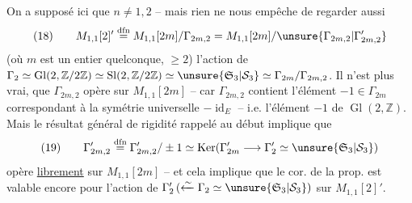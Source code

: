 On a supposé ici que $n\ne1,2$ -- mais rien ne nous empêche de regarder aussi 
\[
(18)\qquad M_{1,1}[2]'\overset{\mathrm{dfn}}{=}M_{1,1}[2m]/\Gamma_{2m,2}
=M_{1,1}[2m]/\unsure{\Gamma_{2m,2}|\Gamma'_{2m,2}}
\]
(où $m$ est un entier quelconque, $\ge2$)
l'action de $\Gamma_2\simeq\operatorname{Gl}(2,\mathbb Z/2\mathbb Z)\simeq\operatorname{Sl}(2,\mathbb Z/2\mathbb Z)\simeq\unsure{\mathfrak S_3|\mathcal S_3}\simeq\Gamma_{2m}/\Gamma_{2m,2}$.  Il n'est plus vrai,  que $\Gamma_{2m,2}$ opère  sur $M_{1,1}[2m]$ -- car $\Gamma_{2m,2}$ contient l'élément $-1\in\Gamma_{2m}$ correspondant à la symétrie universelle $-\operatorname{id}_E$ -- i.e.  l'élément  $-1$ de $\operatorname{Gl}(2,\mathbb Z)$. Mais le résultat général de rigidité rappelé au début implique que 
\[
(19)\qquad\Gamma'_{2m,2}\overset{\mathrm{dfn}}{=}\Gamma_{2m,2}'/\pm1
\simeq\operatorname{Ker}(\Gamma'_{2m}\longrightarrow\Gamma'_2\simeq\unsure{\mathfrak S_3|\mathcal S_3})
\]
opère   \uline{librement} sur $M_{1,1}[2m]$ -- et cela implique que le cor. de la prop. est valable encore pour l'action de $\Gamma'_2\,(\xleftarrow{\sim}\Gamma_2\simeq\unsure{\mathfrak S_3|\mathcal S_3})$ sur $M_{1,1}[2]'$.

